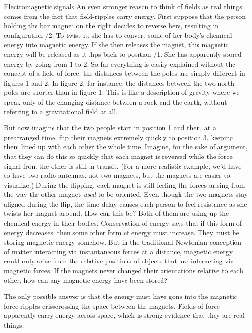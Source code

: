 \begin{envsubsection}{Electromagnetic signals}
An even stronger reason to think of fields as real things\label{energy-in-fields}
comes from the fact that field-ripples carry energy.
First suppose that the person holding the bar magnet on the
right decides to reverse hers, resulting in configuration
/2. To twist it, she has to convert some of her
body's chemical energy into magnetic energy.
If she then releases the magnet, this magnetic energy will be released as it flips
back to position /1. She has apparently stored energy by going from
1 to 2.
So far everything is easily explained without
the concept of a field of force: the distances between the poles
are simply different in figures
1 and 2. In figure 2, for instance, the distances between the two north poles are
shorter than in figure 1. This is like a description of gravity where we speak
only of the changing distance between a rock and the earth, without referring to
a gravitational field at all.

But now imagine that the two people start in position 1
and then, at a prearranged time, flip their magnets extremely quickly
to position 3, keeping them lined up with each other the
whole time. Imagine, for the sake of argument, that they can
do this so quickly that each magnet is reversed while the
force signal from the other is still in transit. (For a more
realistic example, we'd have to have two radio antennas, not
two magnets, but the magnets are easier to visualize.)
During the flipping, each magnet is still feeling the forces
arising from the way the other magnet \emph{used} to be
oriented. Even though the two magnets stay aligned during
the flip, the time delay causes each person to feel
resistance as she twists her magnet around. How can this be?
Both of them are using up the chemical energy in their bodies.
Conservation of energy says that if this form of energy decreases,
then some other form of energy must increase. They
must be storing magnetic energy somehow. But in the
traditional Newtonian conception of matter interacting via
instantaneous forces at a distance, magnetic energy could only arise
from the relative positions of objects that are interacting
via magnetic forces. If the magnets never changed their orientations
relative to each other, how can any magnetic energy have been stored?

The only possible answer is that the energy must have gone
into the magnetic force ripples crisscrossing the space
between the magnets. Fields of force apparently carry energy
across space, which is strong evidence that they are real things.


\end{envsubsection}
